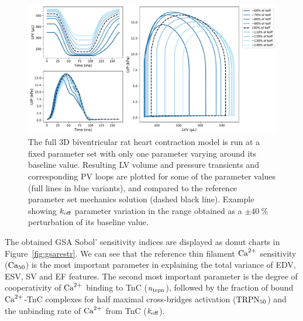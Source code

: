 \begin{figure}[h!]
    \myfloatalign
    \includegraphics[width=\textwidth]{figures/chapter08/Fig2.pdf}
    \caption{The full $3$D biventricular rat heart contraction model is run at a fixed parameter set with only one parameter varying around its baseline value. Resulting LV volume and pressure transients and corresponding PV loops are plotted for some of the parameter values (full lines in blue variants), and compared to the reference parameter set mechanics solution (dashed black line). Example showing $k_{\textrm{off}}$ parameter variation in the range obtained as a $\pm\SI{40}{\percent}$ perturbation of its baseline value.}
    \label{fig:EFvskoff}
\end{figure}

\vspace{0.2cm}
The obtained GSA Sobol' sensitivity indices are displayed as donut charts in Figure~\ref{fig:gsarestr}. We can see that the reference thin filament $\textrm{Ca}^{2+}$ sensitivity ($\textrm{Ca}_{50}$) is the most important parameter in explaining the total variance of EDV, ESV, SV and EF features. The second most important parameter is the degree of cooperativity of $\textrm{Ca}^{2+}$ binding to TnC ($n_{\textrm{trpn}}$), followed by the fraction of bound $\textrm{Ca}^{2+}$-TnC complexes for half maximal cross-bridges activation ($\textrm{TRPN}_{50}$) and the unbinding rate of $\textrm{Ca}^{2+}$ from TnC ($k_{\textrm{off}}$).

